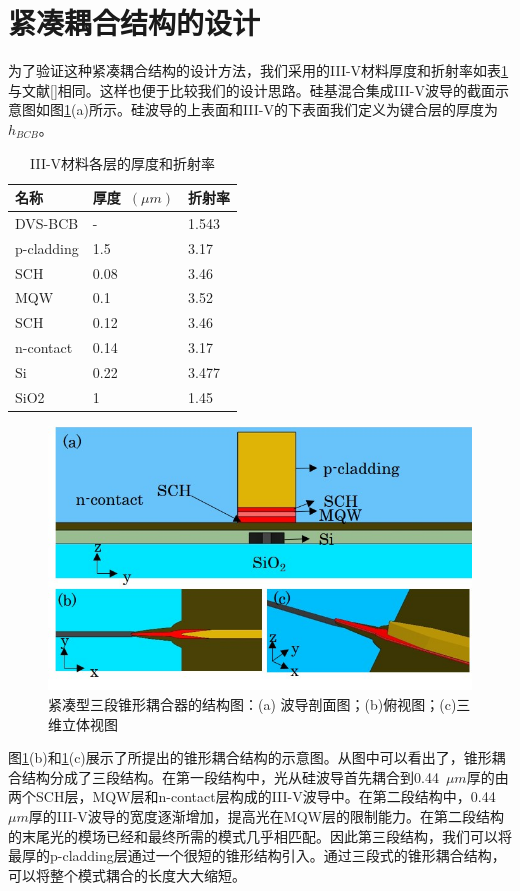 \section{紧凑耦合结构的设计}
为了验证这种紧凑耦合结构的设计方法，我们采用的III-V材料厚度和折射率如表\ref{IIIV_qian_str}与文献[]相同。这样也便于比较我们的设计思路。硅基混合集成III-V波导的截面示意图如图\ref{fig_ch3_3d_taper}(a)所示。硅波导的上表面和III-V的下表面我们定义为键合层的厚度为$h_{BCB}$。
{
	\begin{table}[htb]
		\caption{III-V材料各层的厚度和折射率}
		\label{IIIV_qian_str}
		\centering
		\begin{tabular}[t]{lll}
			\hline
			名称  & 厚度~$(\mu m)$  & 折射率 \\
			\hline
			DVS-BCB & - & 1.543\\
			p-cladding & 1.5 &3.17 \\
			SCH & 0.08 & 3.46 \\
			MQW & 0.1 & 3.52 \\
			SCH & 0.12 & 3.46 \\
			n-contact & 0.14 & 3.17 \\
			Si & 0.22 & 3.477 \\
			SiO2 & 1 & 1.45 \\
			\hline
		\end{tabular}
	\end{table}
}

\begin{figure}[htb]
	\centering
	\includegraphics[width=12cm]{./Pictures/fig_ch3_3d_taper.jpg}
	\caption{紧凑型三段锥形耦合器的结构图：(a) 波导剖面图；(b)俯视图；(c)三维立体视图}
	\label{fig_ch3_3d_taper}
\end{figure}


图\ref{fig_ch3_3d_taper}(b)和\ref{fig_ch3_3d_taper}(c)展示了所提出的锥形耦合结构的示意图。从图中可以看出了，锥形耦合结构分成了三段结构。在第一段结构中，光从硅波导首先耦合到0.44~$\mu m$厚的由两个SCH层，MQW层和n-contact层构成的III-V波导中。在第二段结构中，0.44~$\mu m$厚的III-V波导的宽度逐渐增加，提高光在MQW层的限制能力。在第二段结构的末尾光的模场已经和最终所需的模式几乎相匹配。因此第三段结构，我们可以将最厚的p-cladding层通过一个很短的锥形结构引入。通过三段式的锥形耦合结构，可以将整个模式耦合的长度大大缩短。

